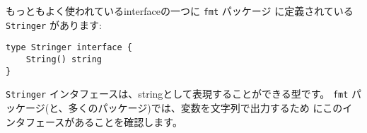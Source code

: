 もっともよく使われているinterfaceの一つに \texttt{fmt} パッケージ
に定義されている \texttt{Stringer} があります:

\begin{lstlisting}[numbers=none]
type Stringer interface {
    String() string
}
\end{lstlisting}

\texttt{Stringer} インタフェースは、stringとして表現することができる型です。
\texttt{fmt} パッケージ(と、多くのパッケージ)では、変数を文字列で出力するため
にこのインタフェースがあることを確認します。